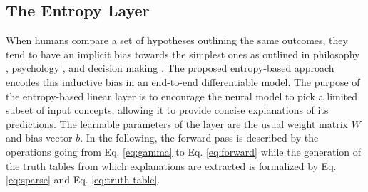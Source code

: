 \documentclass[withindex,glossary]{cam-thesis}
\theoremstyle{plain}
\theoremstyle{definition}
\theoremstyle{remark}
\begin{document}
\subsection{The Entropy Layer}
When humans compare a set of hypotheses outlining the same outcomes, they tend to have an implicit bias towards the simplest ones as outlined in philosophy \citep{soklakov2002occam,rathmanner2011philosophical},
psychology \citep{miller1956magical,cowan2001magical}, and decision making \citep{simon1956rational,simon1957models,simon1979rational}.
The proposed entropy-based approach encodes this inductive bias in an end-to-end differentiable model. The purpose of the entropy-based linear layer is to encourage the neural model to pick a limited subset of input concepts, allowing it to provide concise explanations of its predictions. The learnable parameters of the layer are the usual weight matrix $W$ and bias vector $b$. In the following, the forward pass is described by the operations going from Eq. \ref{eq:gamma} to Eq. \ref{eq:forward}
while %
the generation of the truth tables from which explanations are extracted 
is formalized by %
Eq. \ref{eq:sparse} and Eq. \ref{eq:truth-table}.

\end{document}
